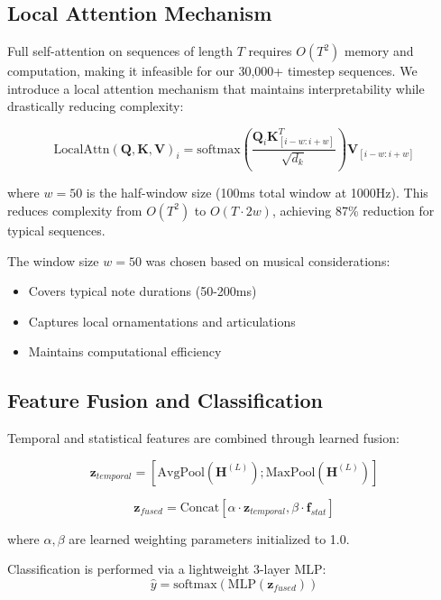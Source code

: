 \subsection{Local Attention Mechanism}

Full self-attention on sequences of length $T$ requires $O(T^2)$ memory and computation, making it infeasible for our 30,000+ timestep sequences. We introduce a local attention mechanism that maintains interpretability while drastically reducing complexity:

\begin{equation}
\text{LocalAttn}(\mathbf{Q}, \mathbf{K}, \mathbf{V})_i = \text{softmax}\left(\frac{\mathbf{Q}_i \mathbf{K}_{[i-w:i+w]}^T}{\sqrt{d_k}}\right)\mathbf{V}_{[i-w:i+w]}
\end{equation}

where $w=50$ is the half-window size (100ms total window at 1000Hz). This reduces complexity from $O(T^2)$ to $O(T \cdot 2w)$, achieving 87\% reduction for typical sequences.

The window size $w=50$ was chosen based on musical considerations:
\begin{itemize}
\item Covers typical note durations (50-200ms)
\item Captures local ornamentations and articulations
\item Maintains computational efficiency
\end{itemize}

\subsection{Feature Fusion and Classification}

Temporal and statistical features are combined through learned fusion:

\begin{equation}
\mathbf{z}_{temporal} = [\text{AvgPool}(\mathbf{H}^{(L)}); \text{MaxPool}(\mathbf{H}^{(L)})]
\end{equation}

\begin{equation}
\mathbf{z}_{fused} = \text{Concat}[\alpha \cdot \mathbf{z}_{temporal}, \beta \cdot \mathbf{f}_{stat}]
\end{equation}

where $\alpha, \beta$ are learned weighting parameters initialized to 1.0.

Classification is performed via a lightweight 3-layer MLP:
\begin{equation}
\hat{y} = \text{softmax}(\text{MLP}(\mathbf{z}_{fused}))
\end{equation}

